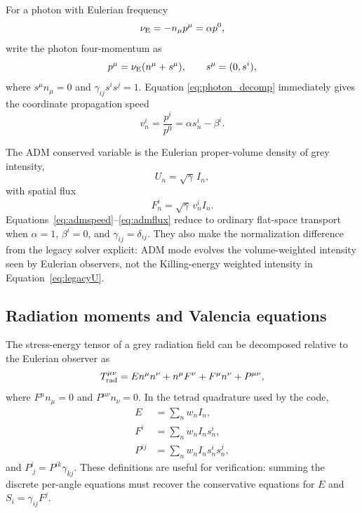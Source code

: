 \documentclass[11pt]{article}
\newcommand{\I}{I}
\newcommand{\nuE}{\nu_{\rm E}}
\begin{document}
For a photon with Eulerian frequency
\begin{equation}
  \nuE = -n_\mu p^\mu = \alpha p^0 ,
\end{equation}
write the photon four-momentum as
\begin{equation}
  p^\mu = \nuE(n^\mu+s^\mu), \qquad s^\mu=(0,s^i),
  \label{eq:photon_decomp}
\end{equation}
where \(s^\mu n_\mu=0\) and \(\gamma_{ij}s^is^j=1\).  Equation
\eqref{eq:photon_decomp} immediately gives the coordinate propagation speed
\begin{equation}
  v^i_n=\frac{p^i}{p^0}=\alpha s^i_n-\beta^i .
  \label{eq:admspeed}
\end{equation}

The ADM conserved variable is the Eulerian proper-volume density of grey
intensity,
\begin{equation}
  U_n = \sqrt{\gamma}\,\I_n ,
  \label{eq:admU}
\end{equation}
with spatial flux
\begin{equation}
  F^i_n = \sqrt{\gamma}\,v^i_n\I_n .
  \label{eq:admflux}
\end{equation}
Equations~\eqref{eq:admspeed}--\eqref{eq:admflux} reduce to ordinary flat-space
transport when \(\alpha=1\), \(\beta^i=0\), and
\(\gamma_{ij}=\delta_{ij}\).  They also make the normalization difference from
the legacy solver explicit: ADM mode evolves the volume-weighted intensity
seen by Eulerian observers, not the Killing-energy weighted intensity in
Equation~\eqref{eq:legacyU}.

\subsection{Radiation moments and Valencia equations}

The stress-energy tensor of a grey radiation field can be decomposed relative
to the Eulerian observer as
\begin{equation}
  T_{\rm rad}^{\mu\nu}
  =
  E n^\mu n^\nu
  +n^\mu F^\nu+F^\mu n^\nu
  +P^{\mu\nu},
  \label{eq:rad_tmunu_decomp}
\end{equation}
where \(F^\mu n_\mu=0\) and \(P^{\mu\nu}n_\nu=0\).  In the tetrad quadrature
used by the code,
\begin{align}
  E &= \sum_n w_n \I_n, \\
  F^i &= \sum_n w_n \I_n s^i_n, \\
  P^{ij} &= \sum_n w_n \I_n s^i_n s^j_n ,
  \label{eq:moments}
\end{align}
and \(P^i_{\ j}=P^{ik}\gamma_{kj}\).  These definitions are useful for
verification: summing the discrete per-angle equations must recover the
conservative equations for \(E\) and \(S_i=\gamma_{ij}F^j\).
\end{document}
